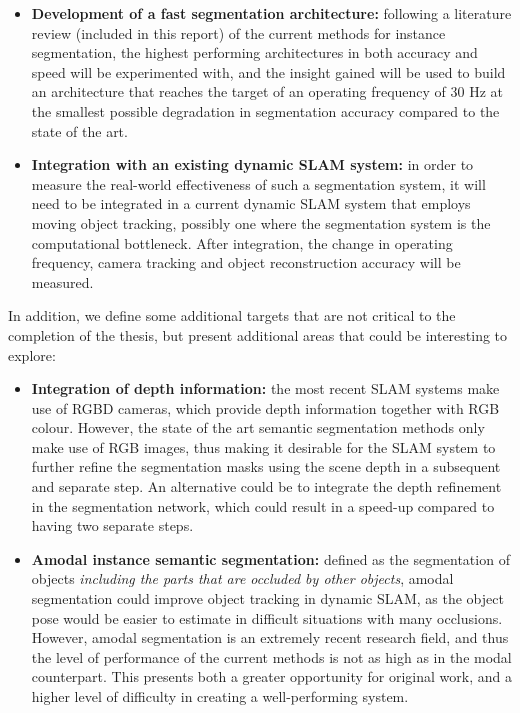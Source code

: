 \documentclass[12pt,twoside]{report}
\begin{document}
\begin{itemize}
\item \textbf{Development of a fast segmentation architecture:} following a literature review (included in this report) of the current methods for instance segmentation, the highest performing architectures in both accuracy and speed will be experimented with, and the insight gained will be used to build an architecture that reaches the target of an operating frequency of 30 Hz at the smallest possible degradation in segmentation accuracy compared to the state of the art.
\item \textbf{Integration with an existing dynamic SLAM system:} in order to measure the real-world effectiveness of such a segmentation system, it will need to be integrated in a current dynamic SLAM system that employs moving object tracking, possibly one where the segmentation system is the computational bottleneck. After integration, the change in operating frequency, camera tracking and object reconstruction accuracy will be measured.
\end{itemize}

In addition, we define some additional targets that are not critical to the completion of the thesis, but present additional areas that could be interesting to explore:

\begin{itemize}
\item \textbf{Integration of depth information:} the most recent SLAM systems make use of RGBD cameras, which provide depth information together with RGB colour. However, the state of the art semantic segmentation methods only make use of RGB images, thus making it desirable for the SLAM system to further refine the segmentation masks using the scene depth in a subsequent and separate step. An alternative could be to integrate the depth refinement in the segmentation network, which could result in a speed-up compared to having two separate steps.
\item \textbf{Amodal instance semantic segmentation:} defined as the segmentation of objects \textit{including the parts that are occluded by other objects}, amodal segmentation could improve object tracking in dynamic SLAM, as the object pose would be easier to estimate in difficult situations with many occlusions. However, amodal segmentation is an extremely recent research field, and thus the level of performance of the current methods is not as high as in the modal counterpart. This presents both a greater opportunity for original work, and a higher level of difficulty in creating a well-performing system.
\end{itemize}
\end{document}
